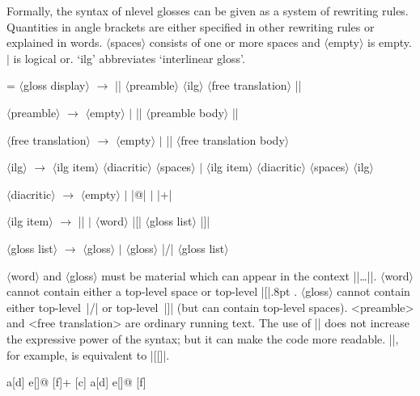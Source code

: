 
\def\<#1>{$\langle$#1$\rangle$}

Formally, the syntax of nlevel glosses can be given as a system of
rewriting rules.  Quantities in angle brackets are either specified in
other rewriting rules or explained in words. \<spaces> consists of one
or more spaces and \<empty> is empty.  $\vert$ is logical or.  `ilg'
abbreviates `interlinear gloss'.

\bigskip
\begingroup
\leftskip=\parindent
{}
\parindent=0pt
\<gloss display> $\to$ |\begingl| \<preamble> \<ilg>
\<free translation> |\endgl|

\<preamble> $\to$ \<empty> $\vert$ |\glpreamble| \<preamble body>
|\endpreamble|

\<free translation> $\to$ \<empty> $\vert$ |\glft| \<free translation body>

\<ilg> $\to$ \<ilg item> \<diacritic> \<spaces> $\vert$ \<ilg item>
\<diacritic> \<spaces> \<ilg>

\<diacritic> $\to$ \<empty> $\vert$ |@| $\vert$ |+|

\<ilg item> $\to$ || $\vert$
\<word> |[| \<gloss list> |]|

\<gloss list> $\to$ \<gloss> $\vert$ \<gloss> |/| \<gloss list>

\bigskip
\endgroup
\noindent
\<word> and \<gloss> must be material which can appear in the context
|\hbox{|\dots|}|. \<word> cannot contain either a top-level space or
top-level |[|\kern.8pt . \<gloss> cannot contain either top-level~|/|
or top-level~|]| (but can contain top-level spaces).  <preamble> and
<free translation> are ordinary running text.  The use of |\nogloss|
does not increase the expressive power of the syntax; but it can make
the code more readable.  |\nogloss{[}|, for example, is equivalent to
|{[}[]|.

\makeatletter
\def\gln@begingl{\bgroup
   \@glspacefalse
   \ep@setglstrut
   \ifdim\ling@glwidth=0pt
      \bgroup
   \else
      \vtop\bgroup
         \hsize=\ling@glwidth
         \leftskip=0pt
   \fi
   \edef\gl@restoreouterbaselineskip{\noexpand\baselineskip=\the\baselineskip}%
   \futurelet\temp\gln@Ca
   \ifnum\ep@glhangstyle=0
      \or
         \hangindent=\ling@glhangindent
         \hangafter=1
      \or
 }
\resetatcatcode


\ex
\begingl[glstyle=nlevel,glhangstyle=none]
[c] a[d] e[]@ [f]+ [c] a[d] e[]@ [f]
\endgl
\xe

